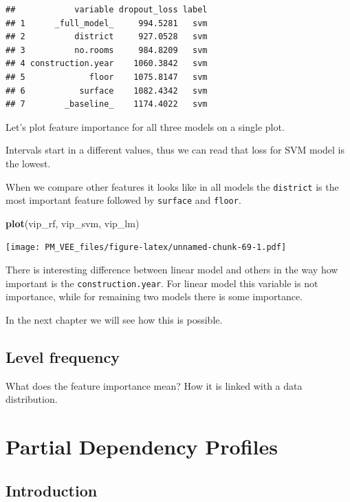\documentclass[12pt,]{krantz}
\newenvironment{Shaded}{\begin{snugshade}}{\end{snugshade}}
\newcommand{\KeywordTok}[1]{\textcolor[rgb]{0.13,0.29,0.53}{\textbf{#1}}}
\newcommand{\NormalTok}[1]{#1}
\begin{document}
\begin{verbatim}
##            variable dropout_loss label
## 1      _full_model_     994.5281   svm
## 2          district     927.0528   svm
## 3          no.rooms     984.8209   svm
## 4 construction.year    1060.3842   svm
## 5             floor    1075.8147   svm
## 6           surface    1082.4342   svm
## 7        _baseline_    1174.4022   svm
\end{verbatim}

Let's plot feature importance for all three models on a single plot.

Intervals start in a different values, thus we can read that loss for SVM model is the lowest.

When we compare other features it looks like in all models the \texttt{district} is the most important feature followed by \texttt{surface} and \texttt{floor}.

\begin{Shaded}
\begin{Highlighting}[]
\KeywordTok{plot}\NormalTok{(vip_rf, vip_svm, vip_lm)}
\end{Highlighting}
\end{Shaded}

\texttt{[image: PM\_VEE\_files/figure-latex/unnamed-chunk-69-1.pdf]}

There is interesting difference between linear model and others in the way how important is the \texttt{construction.year}. For linear model this variable is not importance, while for remaining two models there is some importance.

In the next chapter we will see how this is possible.

\hypertarget{level-frequency}{%
\subsection{Level frequency}\label{level-frequency}}

What does the feature importance mean? How it is linked with a data distribution.

\hypertarget{partialDependenceProfiles}{%
\section{Partial Dependency Profiles}\label{partialDependenceProfiles}}

\hypertarget{PDPIntro}{%
\subsection{Introduction}\label{PDPIntro}}
\end{document}

